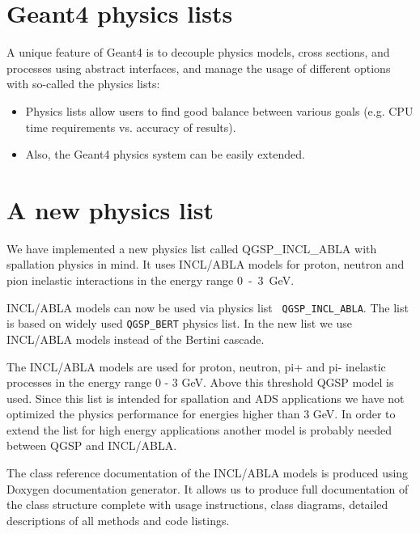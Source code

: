 \documentclass[a4paper]{jpconf}
\begin{document}
\section{Geant4 physics lists}

A unique feature of Geant4 is to  
decouple physics models, cross sections, and processes
using abstract interfaces, and manage the usage of different options with so-called the physics lists:
\begin{itemize}
\item Physics lists allow users to find good balance between various goals (e.g. CPU
time requirements vs. accuracy of results).
\item Also, the Geant4 physics system can be easily extended.
\end{itemize}



\section{A new physics list}

We have implemented a new physics list called {\sf QGSP\_\-INCL\_ABLA} with
spallation physics in mind. 
It uses INCL/ABLA models for proton,
neutron and pion inelastic interactions in the energy range 0~-~3~GeV.

INCL/ABLA models can now be used via physics list {\tt
QGSP\_INCL\_ABLA}. The list is based on widely used {\tt QGSP\_BERT}
physics list. In the new list we use INCL/ABLA models instead of the
Bertini cascade.

The INCL/ABLA models are used for proton, neutron, pi+ and pi-
inelastic processes in the energy range 0 - 3 GeV. Above this
threshold QGSP model is used. Since this list is intended for
spallation and ADS applications we have not optimized the physics
performance for energies higher than 3 GeV. In order to extend the
list for high energy applications another model is probably needed
between QGSP and INCL/ABLA.

The class reference documentation of the INCL/ABLA models is produced
using Doxygen \cite{doxygen} documentation generator. It allows us to
produce full documentation of the class structure complete with usage
instructions, class diagrams, detailed descriptions of all methods and
code listings.
\end{document}
